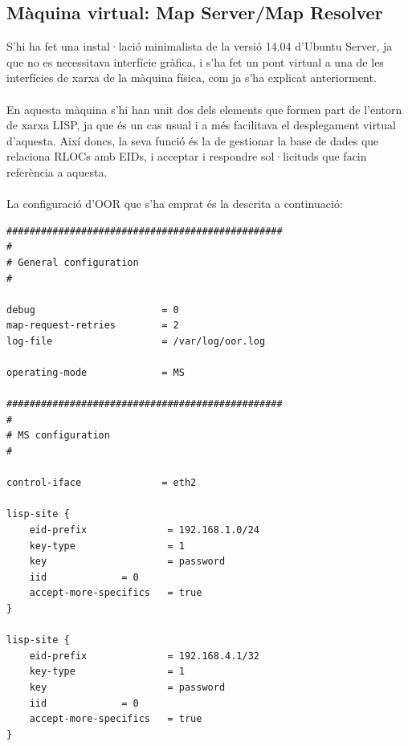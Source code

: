 \documentclass[11pt]{article}
\begin{document}
\subsection{Màquina virtual: Map Server/Map Resolver}
S’hi ha fet una instal·lació minimalista de la versió 14.04 d’Ubuntu Server, ja que no es necessitava interfície gràfica, i s’ha fet un pont virtual a una de les interfícies de xarxa de la màquina física, com ja s’ha explicat anteriorment.\\
\\
En aquesta màquina s’hi han unit dos dels elements que formen part de l’entorn de xarxa LISP, ja que és un cas usual i a més facilitava el desplegament virtual d’aquesta. Així doncs, la seva funció és la de gestionar la base de dades que relaciona RLOCs amb EIDs, i acceptar i respondre sol·licituds que facin referència a aquesta.\\
\\
La configuració d’OOR que s’ha emprat és la descrita a continuació:\\
\lstset{caption=Configuració d'OOR del Map Server/Map Resolver}
\begin{lstlisting}[frame=single]
################################################
#
# General configuration
#

debug                      = 0 
map-request-retries        = 2
log-file                   = /var/log/oor.log
 
operating-mode             = MS

################################################
#
# MS configuration
#

control-iface              = eth2

lisp-site {
    eid-prefix            	= 192.168.1.0/24
    key-type              	= 1
    key                   	= password
    iid				= 0
    accept-more-specifics	= true
}

lisp-site {
    eid-prefix            	= 192.168.4.1/32
    key-type              	= 1
    key                   	= password
    iid				= 0
    accept-more-specifics	= true
}
\end{lstlisting}
\end{document}
